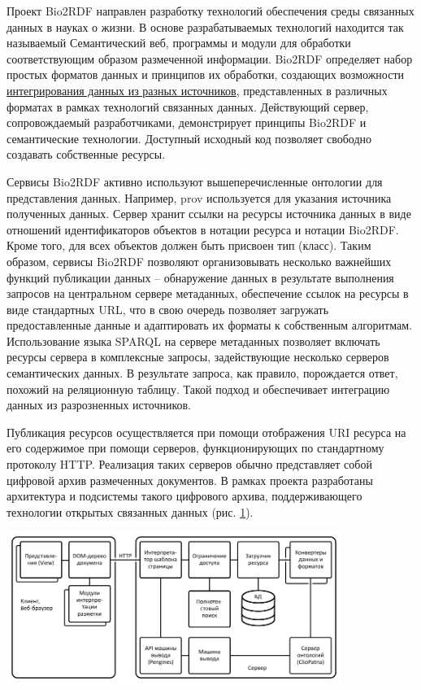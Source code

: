 \documentclass[a4paper,12pt,openany,final]{extreport}
\begin{document}
Проект Bio2RDF направлен разработку технологий обеспечения среды
связанных данных в науках о жизни. В основе разрабатываемых технологий
находится так называемый Семантический веб, программы и модули для
обработки соответствующим образом размеченной информации. Bio2RDF
определяет набор простых форматов данных и принципов их обработки,
создающих возможности
\href{https://docs.google.com/presentation/d/1SG6PFew2CPK1o_jRCYx30DFnuGEEr0uWVKPnz7Uqw5k/pub?start=false\&loop=false\&delayms=3000\&slide=id.p}{{интегрирования
данных из разных источников}}, представленных в различных форматах в
рамках технологий связанных данных. Действующий сервер, сопровождаемый
разработчиками, демонстрирует принципы Bio2RDF и семантические
технологии. Доступный исходный код позволяет свободно создавать
собственные ресурсы.

Сервисы Bio2RDF активно используют вышеперечисленные онтологии для
представления данных. Например, prov используется для указания источника
полученных данных. Сервер хранит ссылки на ресурсы источника данных в
виде отношений идентификаторов объектов в нотации ресурса и нотации
Bio2RDF. Кроме того, для всех объектов должен быть присвоен тип (класс).
Таким образом, сервисы Bio2RDF позволяют организовывать несколько
важнейших функций публикации данных -- обнаружение данных в результате
выполнения запросов на центральном сервере метаданных, обеспечение
ссылок на ресурсы в виде стандартных URL, что в свою очередь позволяет
загружать предоставленные данные и адаптировать их форматы к собственным
алгоритмам. Использование языка SPARQL на сервере метаданных позволяет
включать ресурсы сервера в комплексные запросы, задействующие несколько
серверов семантических данных. В результате запроса, как правило,
порождается ответ, похожий на реляционную таблицу. Такой подход и
обеспечивает интеграцию данных из разрозненных источников.

Публикация ресурсов осуществляется при помощи отображения URI ресурса на
его содержимое при помощи серверов, функционирующих по стандартному
протоколу HTTP. Реализация таких серверов обычно представляет собой
цифровой архив размеченных документов. В рамках проекта разработаны
архитектура и подсистемы такого цифрового архива, поддерживающего
технологии открытых связанных данных (рис.
\href{file://///home/eugeneai/Development/text/Projects/Lin-2017/report-2017/annotation.html\#fig:architecture-LOD}{1}).

\includegraphics[width=4.28819in,height=1.94444in]{media/image18.png}
\end{document}

